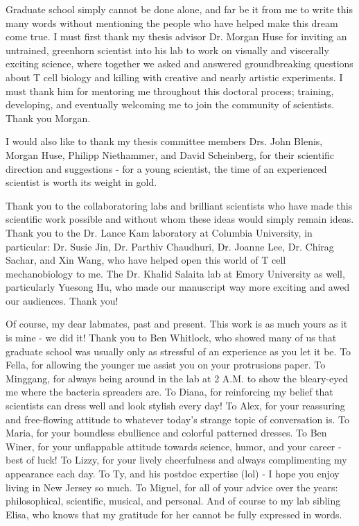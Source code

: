 \documentclass[phd,tocprelim]{cornell}
\begin{document}
\begin{acknowledgements}
Graduate school simply cannot be done alone, and far be it from me to write this many words without mentioning the people who have helped make this dream come true. I must first thank my thesis advisor Dr. Morgan Huse for inviting an untrained, greenhorn scientist into his lab to work on visually and viscerally exciting science, where together we asked and answered groundbreaking questions about T cell biology and killing with creative and nearly artistic experiments. I must thank him for mentoring me throughout this doctoral process; training, developing, and eventually welcoming me to join the community of scientists. Thank you Morgan.

I would also like to thank my thesis committee members Drs. John Blenis,  Morgan Huse, Philipp Niethammer, and David Scheinberg, for their scientific direction and suggestions - for a young scientist, the time of an experienced scientist is worth its weight in gold. 

Thank you to the collaboratoring labs and brilliant scientists who have made this scientific work possible and without whom these ideas would simply remain ideas. Thank you to the Dr. Lance Kam laboratory at Columbia University, in particular: Dr. Susie Jin, Dr. Parthiv Chaudhuri,  Dr. Joanne Lee, Dr. Chirag Sachar, and Xin Wang, who have helped open this world of T cell mechanobiology to me. The Dr. Khalid Salaita lab at Emory University as well, particularly Yuesong Hu, who made our manuscript way more exciting and awed our audiences. Thank you!

Of course, my dear labmates, past and present. This work is as much yours as it is mine - we did it! Thank you to Ben Whitlock, who showed many of us that graduate school was usually only as stressful of an experience as you let it be. To Fella, for allowing the younger me assist you on your protrusions paper. To Minggang, for always being around in the lab at 2 A.M. to show the bleary-eyed me where the bacteria spreaders are. To Diana, for reinforcing my belief that scientists can dress well and look stylish every day! To Alex, for your reassuring and free-flowing attitude to whatever today's strange topic of conversation is. To Maria, for your boundless ebullience and colorful patterned dresses. To Ben Winer, for your unflappable attitude towards science, humor, and your career - best of luck! To Lizzy, for your lively cheerfulness and always complimenting my appearance each day. To Ty, and his postdoc expertise (lol) - I hope you enjoy living in New Jersey so much. To Miguel, for all of your advice over the years: philosophical, scientific, musical, and personal. And of course to my lab sibling Elisa, who knows that my gratitude for her cannot be fully expressed in words. 


\end{acknowledgements}
\end{document}
